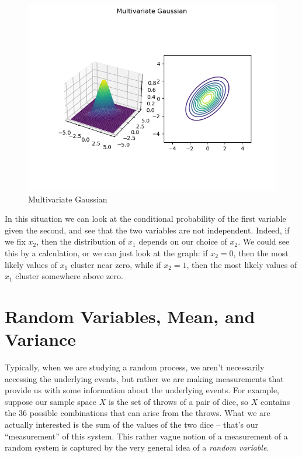 \documentclass[
  11pt,
  letterpaper,
]{scrbook}
\theoremstyle{plain}
\theoremstyle{plain}
\theoremstyle{remark}
\begin{document}
\begin{figure}

{\centering \includegraphics{chapters/img/ellipse.png}

}

\caption{\label{fig-multivariate}Multivariate Gaussian}

\end{figure}

In this situation we can look at the conditional probability of the
first variable given the second, and see that the two variables are not
independent. Indeed, if we fix \(x_2\), then the distribution of \(x_1\)
depends on our choice of \(x_2\). We could see this by a calculation, or
we can just look at the graph: if \(x_2=0\), then the most likely values
of \(x_1\) cluster near zero, while if \(x_2=1\), then the most likely
values of \(x_1\) cluster somewhere above zero.

\hypertarget{random-variables-mean-and-variance}{%
\section{Random Variables, Mean, and
Variance}\label{random-variables-mean-and-variance}}

Typically, when we are studying a random process, we aren't necessarily
accessing the underlying events, but rather we are making measurements
that provide us with some information about the underlying events. For
example, suppose our sample space \(X\) is the set of throws of a pair
of dice, so \(X\) contains the \(36\) possible combinations that can
arise from the throws. What we are actually interested is the sum of the
values of the two dice -- that's our ``measurement'' of this system.
This rather vague notion of a measurement of a random system is captured
by the very general idea of a \emph{random variable}.
\end{document}
